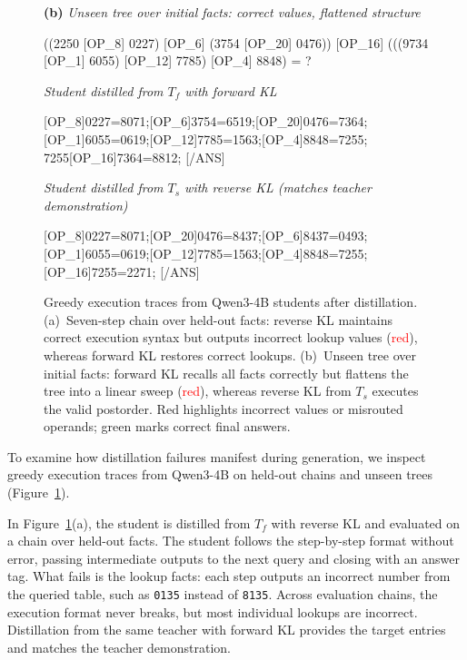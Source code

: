 \documentclass[]{template}
\theoremstyle{plain}
\theoremstyle{definition}
\theoremstyle{remark}
\begin{document}
\begin{figure}[t]
\medskip
\begin{tcolorbox}[colback=lightgray!12,colframe=Black,boxrule=0.4pt,left=8pt,right=8pt,top=8pt,bottom=8pt]
\footnotesize
\textbf{(b)} \textit{Unseen tree over initial facts: correct values, flattened structure}\par\smallskip
{\ttfamily\noindent
((2250 [OP\_8] 0227) [OP\_6] (3754 [OP\_20] 0476)) [OP\_16]\newline
\hspace*{1em}(((9734 [OP\_1] 6055) [OP\_12] 7785) [OP\_4] 8848) = ?\par}
\smallskip
\textit{Student distilled from $T_f$ with forward KL}\par\smallskip
{\ttfamily{}[OP\_8]0227=8071;[OP\_6]{\color{red}3754}=6519;[OP\_20]0476=7364;\;[OP\_1]6055=0619;[OP\_12]7785=1563;[OP\_4]8848=7255;\;\newline
{\color{red}7255[OP\_16]7364=8812;} [/ANS]\par}
\smallskip
\textit{Student distilled from $T_s$ with reverse KL (matches teacher demonstration)}\par\smallskip
{\ttfamily{}[OP\_8]0227=8071;[OP\_20]0476=8437;[OP\_6]8437=0493;\;[OP\_1]6055=0619;[OP\_12]7785=1563;[OP\_4]8848=7255;\;[OP\_16]7255=2271; [/ANS]\par}
\end{tcolorbox}
\caption{Greedy execution traces from Qwen3-4B students after distillation. (a)~Seven-step chain over held-out facts: reverse KL maintains correct execution syntax but outputs incorrect lookup values (\textcolor{red}{red}), whereas forward KL restores correct lookups. (b)~Unseen tree over initial facts: forward KL recalls all facts correctly but flattens the tree into a linear sweep (\textcolor{red}{red}), whereas reverse KL from $T_s$ executes the valid postorder. Red highlights incorrect values or misrouted operands; green marks correct final answers.}
\label{fig:trace_mirror}
\end{figure}

To examine how distillation failures manifest during generation, we inspect greedy execution traces from Qwen3-4B on held-out chains and unseen trees (Figure~\ref{fig:trace_mirror}).

In Figure~\ref{fig:trace_mirror}(a), the student is distilled from $T_f$ with reverse KL and evaluated on a chain over held-out facts. The student follows the step-by-step format without error, passing intermediate outputs to the next query and closing with an answer tag. What fails is the lookup facts: each step outputs an incorrect number from the queried table, such as \texttt{0135} instead of \texttt{8135}. Across evaluation chains, the execution format never breaks, but most individual lookups are incorrect. Distillation from the same teacher with forward KL provides the target entries and matches the teacher demonstration.
\end{document}
